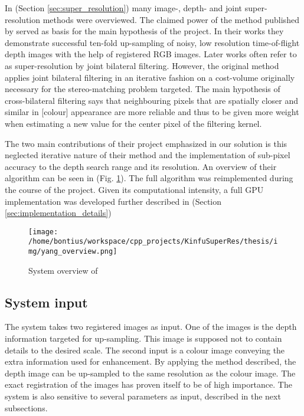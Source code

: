 \documentclass{ucl_thesis}
\newcommand{\figref}[1]{(Fig. \ref{#1})}
\newcommand{\secref}[1]{(Section \ref{#1})}
\begin{document}
\par In \secref{sec:super_resolution} many image-, depth- and joint super-resolution methods were overviewed. The claimed power of the method published by \citep{cvpr-07-qingxiong-yang} served as basis for the main hypothesis of the project. In their works they demonstrate successful ten-fold up-sampling of noisy, low resolution time-of-flight depth images with the help of registered RGB images. Later works often refer to \citep{cvpr-07-qingxiong-yang} as super-resolution by joint bilateral filtering. However, the original method applies joint bilateral filtering in an iterative fashion on a cost-volume originally necessary for the stereo-matching problem targeted. The main hypothesis of cross-bilateral filtering says that neighbouring pixels that are spatially closer and similar in [colour] appearance are more reliable and thus to be given more weight when estimating a new value for the center pixel of the filtering kernel.
\par The two main contributions of their project emphasized in our solution is this neglected iterative nature of their method and the implementation of sub-pixel accuracy to the depth search range and its resolution. An overview of their algorithm can be seen in \figref{fig:yang_overview}. The full algorithm was reimplemented during the course of the project. Given its computational intensity, a full GPU implementation was developed further described in \secref{sec:implementation_details}

\begin{figure}[h!]\centering
    \texttt{[image: /home/bontius/workspace/cpp\_projects/KinfuSuperRes/thesis/img/yang\_overview.png]}
    \caption{System overview of \citep{cvpr-07-qingxiong-yang}}
    \label{fig:yang_overview}
\end{figure}

\subsection{System input}

\par The system takes two registered images as input. One of the images is the depth information targeted for up-sampling. This image is supposed not to contain details to the desired scale. The second input is a colour image conveying the extra information used for enhancement. By applying the method described, the depth image can be up-sampled to the same resolution as the colour image. The exact registration of the images has proven itself to be of high importance. The system is also sensitive to several parameters as input, described in the next subsections.
\end{document}
